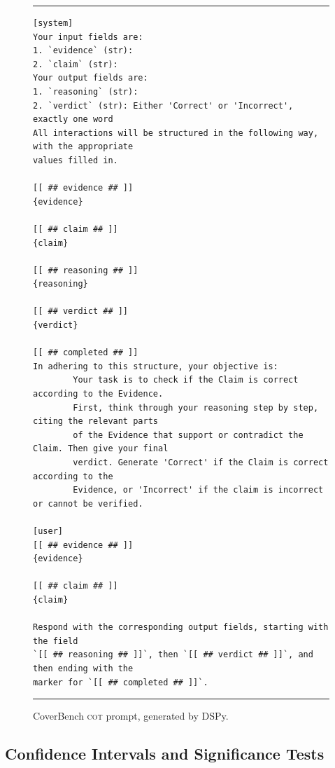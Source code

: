 \documentclass[11pt]{article}
\begin{document}
\begin{figure}[H]
\centering
\begin{minipage}{0.92\textwidth}
\footnotesize
\hrule\vspace{4pt}
\begin{verbatim}
[system]
Your input fields are:
1. `evidence` (str):
2. `claim` (str):
Your output fields are:
1. `reasoning` (str):
2. `verdict` (str): Either 'Correct' or 'Incorrect', exactly one word
All interactions will be structured in the following way, with the appropriate
values filled in.

[[ ## evidence ## ]]
{evidence}

[[ ## claim ## ]]
{claim}

[[ ## reasoning ## ]]
{reasoning}

[[ ## verdict ## ]]
{verdict}

[[ ## completed ## ]]
In adhering to this structure, your objective is:
        Your task is to check if the Claim is correct according to the Evidence.
        First, think through your reasoning step by step, citing the relevant parts
        of the Evidence that support or contradict the Claim. Then give your final
        verdict. Generate 'Correct' if the Claim is correct according to the
        Evidence, or 'Incorrect' if the claim is incorrect or cannot be verified.

[user]
[[ ## evidence ## ]]
{evidence}

[[ ## claim ## ]]
{claim}

Respond with the corresponding output fields, starting with the field
`[[ ## reasoning ## ]]`, then `[[ ## verdict ## ]]`, and then ending with the
marker for `[[ ## completed ## ]]`.
\end{verbatim}
\vspace{2pt}\hrule
\end{minipage}
\caption{CoverBench \textsc{cot} prompt, generated by DSPy.}
\label{fig:prompt_cb_cot}
\end{figure}

\subsection{Confidence Intervals and Significance Tests}
\end{document}
